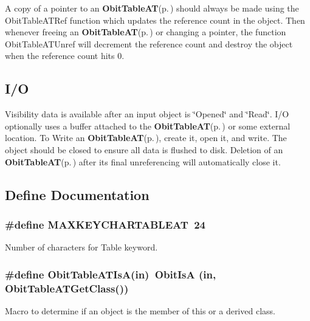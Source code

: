 A copy of a pointer to an {\bf Obit\-Table\-AT}{\rm (p.\,\pageref{structObitTableAT})} should always be made using the Obit\-Table\-ATRef function which updates the reference count in the object. Then whenever freeing an {\bf Obit\-Table\-AT}{\rm (p.\,\pageref{structObitTableAT})} or changing a pointer, the function Obit\-Table\-ATUnref will decrement the reference count and destroy the object when the reference count hits 0.\subsection{I/O}\label{ObitTableAT_8h_ObitTableATUsage}
Visibility data is available after an input object is \char`\"{}Opened\char`\"{} and \char`\"{}Read\char`\"{}. I/O optionally uses a buffer attached to the {\bf Obit\-Table\-AT}{\rm (p.\,\pageref{structObitTableAT})} or some external location. To Write an {\bf Obit\-Table\-AT}{\rm (p.\,\pageref{structObitTableAT})}, create it, open it, and write. The object should be closed to ensure all data is flushed to disk. Deletion of an {\bf Obit\-Table\-AT}{\rm (p.\,\pageref{structObitTableAT})} after its final unreferencing will automatically close it.

\subsection{Define Documentation}
\subsubsection{\setlength{\rightskip}{0pt plus 5cm}\#define MAXKEYCHARTABLEAT\ 24}\label{ObitTableAT_8h_a0}


Number of characters for Table keyword. 

\subsubsection{\setlength{\rightskip}{0pt plus 5cm}\#define Obit\-Table\-ATIs\-A(in)\ Obit\-Is\-A (in, Obit\-Table\-ATGet\-Class())}\label{ObitTableAT_8h_a3}


Macro to determine if an object is the member of this or a derived class. 

